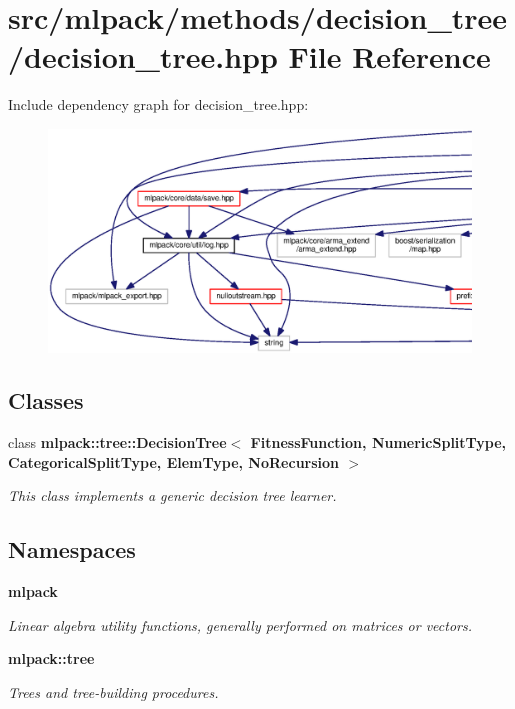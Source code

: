 \section{src/mlpack/methods/decision\+\_\+tree/decision\+\_\+tree.hpp File Reference}
\label{decision__tree_8hpp}
Include dependency graph for decision\+\_\+tree.\+hpp\+:
\nopagebreak
\begin{figure}[H]
\begin{center}
\leavevmode
\includegraphics[width=350pt]{decision__tree_8hpp__incl}
\end{center}
\end{figure}
\subsection*{Classes}
\begin{DoxyCompactItemize}
\item 
class {\bf mlpack\+::tree\+::\+Decision\+Tree$<$ Fitness\+Function, Numeric\+Split\+Type, Categorical\+Split\+Type, Elem\+Type, No\+Recursion $>$}
\begin{DoxyCompactList}\small\item\em This class implements a generic decision tree learner. \end{DoxyCompactList}\end{DoxyCompactItemize}
\subsection*{Namespaces}
\begin{DoxyCompactItemize}
\item 
 {\bf mlpack}
\begin{DoxyCompactList}\small\item\em Linear algebra utility functions, generally performed on matrices or vectors. \end{DoxyCompactList}\item 
 {\bf mlpack\+::tree}
\begin{DoxyCompactList}\small\item\em Trees and tree-\/building procedures. \end{DoxyCompactList}\end{DoxyCompactItemize}
